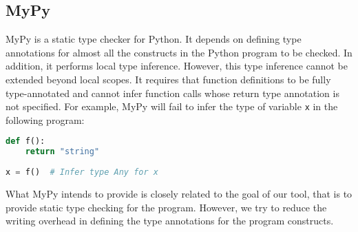 \subsection{MyPy}
MyPy is a static type checker for Python. It depends on defining type annotations for almost all the constructs in the Python program to be checked. In addition, it performs local type inference. However, this type inference cannot be extended beyond local scopes. It requires that function definitions to be fully type-annotated and cannot infer function calls whose return type annotation is not specified. For example, MyPy will fail to infer the type of variable \lstinline|x| in the following program:

\begin{lstlisting}[language=Python]
def f():
	return "string"
	
x = f()  # Infer type Any for x
\end{lstlisting}

What MyPy intends to provide is closely related to the goal of our tool, that is to provide static type checking for the program. However, we try to reduce the writing overhead in defining the type annotations for the program constructs.